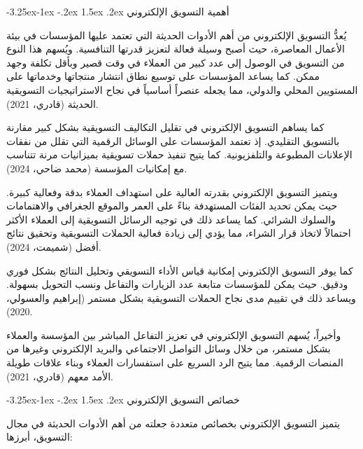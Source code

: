 \documentclass[12pt, a4paper]{report}
\makeatletter
\renewcommand\subsection{\@startsection{subsection}{2}{\z@}%
  {-3.25ex\@plus -1ex \@minus -.2ex}%
  {1.5ex \@plus .2ex}%
  {\normalfont\large\bfseries\color{sectiongray}}}
\makeatother
\begin{document}
\subsection{أهمية التسويق الإلكتروني}

يُعدُّ التسويق الإلكتروني من أهم الأدوات الحديثة التي تعتمد عليها المؤسسات في بيئة الأعمال المعاصرة، حيث أصبح وسيلة فعالة لتعزيز قدرتها التنافسية. ويُسهم هذا النوع من التسويق في الوصول إلى عدد كبير من العملاء في وقت قصير وبأقل تكلفة وجهد ممكن. كما يساعد المؤسسات على توسيع نطاق انتشار منتجاتها وخدماتها على المستويين المحلي والدولي، مما يجعله عنصراً أساسياً في نجاح الاستراتيجيات التسويقية الحديثة (قادري، 2021).

كما يساهم التسويق الإلكتروني في تقليل التكاليف التسويقية بشكل كبير مقارنة بالتسويق التقليدي. إذ تعتمد المؤسسات على الوسائل الرقمية التي تقلل من نفقات الإعلانات المطبوعة والتلفزيونية. كما يتيح تنفيذ حملات تسويقية بميزانيات مرنة تتناسب مع إمكانيات المؤسسة (محمد ضاحي، 2024).

ويتميز التسويق الإلكتروني بقدرته العالية على استهداف العملاء بدقة وفعالية كبيرة. حيث يمكن تحديد الفئات المستهدفة بناءً على العمر والموقع الجغرافي والاهتمامات والسلوك الشرائي. كما يساعد ذلك في توجيه الرسائل التسويقية إلى العملاء الأكثر احتمالاً لاتخاذ قرار الشراء، مما يؤدي إلى زيادة فعالية الحملات التسويقية وتحقيق نتائج أفضل (شميمت، 2024).

كما يوفر التسويق الإلكتروني إمكانية قياس الأداء التسويقي وتحليل النتائج بشكل فوري ودقيق. حيث يمكن للمؤسسات متابعة عدد الزيارات والتفاعل ونسب التحويل بسهولة. ويساعد ذلك في تقييم مدى نجاح الحملات التسويقية بشكل مستمر (إبراهيم والعسولي، 2020).

وأخيراً، يُسهم التسويق الإلكتروني في تعزيز التفاعل المباشر بين المؤسسة والعملاء بشكل مستمر، من خلال وسائل التواصل الاجتماعي والبريد الإلكتروني وغيرها من المنصات الرقمية. مما يتيح الرد السريع على استفسارات العملاء وبناء علاقات طويلة الأمد معهم (قادري، 2021).

\subsection{خصائص التسويق الإلكتروني}

يتميز التسويق الإلكتروني بخصائص متعددة جعلته من أهم الأدوات الحديثة في مجال التسويق، أبرزها:
\end{document}
